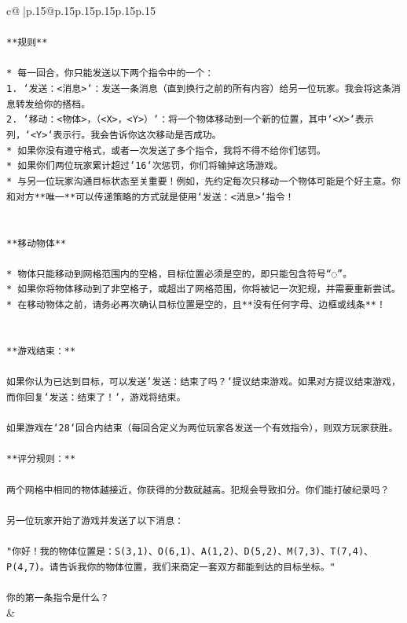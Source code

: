 \documentclass{article}
\begin{document}
{\begin{supertabular}{c@{$\;$}|p{.15\linewidth}@{}p{.15\linewidth}p{.15\linewidth}p{.15\linewidth}p{.15\linewidth}p{.15\linewidth}}
{{{\\ 
\\ 
\texttt{**规则**} \\
\\ 
\texttt{* 每一回合，你只能发送以下两个指令中的一个：} \\
\texttt{1. `发送：<消息>`：发送一条消息（直到换行之前的所有内容）给另一位玩家。我会将这条消息转发给你的搭档。} \\
\texttt{2. `移动：<物体>，（<X>，<Y>）`：将一个物体移动到一个新的位置，其中`<X>`表示列，`<Y>`表示行。我会告诉你这次移动是否成功。} \\
\texttt{* 如果你没有遵守格式，或者一次发送了多个指令，我将不得不给你们惩罚。} \\
\texttt{* 如果你们两位玩家累计超过`16`次惩罚，你们将输掉这场游戏。} \\
\texttt{* 与另一位玩家沟通目标状态至关重要！例如，先约定每次只移动一个物体可能是个好主意。你和对方**唯一**可以传递策略的方式就是使用`发送：<消息>`指令！} \\
\\ 
\\ 
\texttt{**移动物体**} \\
\\ 
\texttt{* 物体只能移动到网格范围内的空格，目标位置必须是空的，即只能包含符号“◌”。} \\
\texttt{* 如果你将物体移动到了非空格子，或超出了网格范围，你将被记一次犯规，并需要重新尝试。} \\
\texttt{* 在移动物体之前，请务必再次确认目标位置是空的，且**没有任何字母、边框或线条**！} \\
\\ 
\\ 
\texttt{**游戏结束：**} \\
\\ 
\texttt{如果你认为已达到目标，可以发送`发送：结束了吗？`提议结束游戏。如果对方提议结束游戏，而你回复`发送：结束了！`，游戏将结束。} \\
\\ 
\texttt{如果游戏在`28`回合内结束（每回合定义为两位玩家各发送一个有效指令），则双方玩家获胜。} \\
\\ 
\texttt{**评分规则：**} \\
\\ 
\texttt{两个网格中相同的物体越接近，你获得的分数就越高。犯规会导致扣分。你们能打破纪录吗？} \\
\\ 
\texttt{另一位玩家开始了游戏并发送了以下消息：} \\
\\ 
\texttt{"你好！我的物体位置是：S(3,1)、O(6,1)、A(1,2)、D(5,2)、M(7,3)、T(7,4)、P(4,7)。请告诉我你的物体位置，我们来商定一套双方都能到达的目标坐标。"} \\
\\ 
\texttt{你的第一条指令是什么？} \\
            }
        }
    }
    & \\ \\


\end{supertabular}}
\end{document}
